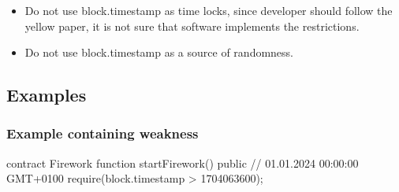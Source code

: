 % 
% 

%
%

\begin{itemize}
\item Do not use block.timestamp as time locks, since developer should follow the yellow paper, it is not sure that software implements the restrictions.
\item Do not use block.timestamp as a source of randomness.
\end{itemize}

\subsection{Examples}
\subsubsection{Example containing weakness}
\begin{solidity}
contract Firework {
    function startFirework() public {
        // 01.01.2024 00:00:00 GMT+0100
        require(block.timestamp > 1704063600);
    }
}
\end{solidity}

